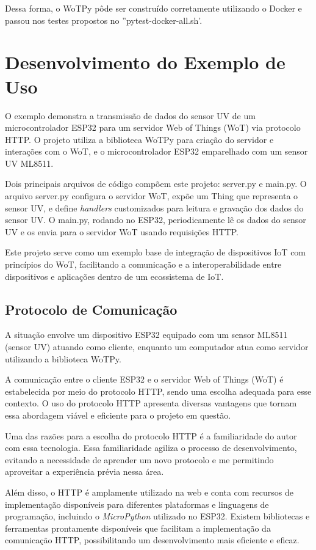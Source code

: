 Dessa forma, o WoTPy pôde ser construído corretamente utilizando o Docker e passou nos testes propostos no ''pytest-docker-all.sh'.

\section{Desenvolvimento do Exemplo de Uso}

O exemplo demonstra a transmissão de dados do sensor UV de um microcontrolador ESP32 para um servidor Web of Things (WoT) via protocolo HTTP. O projeto utiliza a biblioteca WoTPy para criação do servidor e interações com o WoT, e o microcontrolador ESP32 emparelhado com um sensor UV ML8511.

Dois principais arquivos de código compõem este projeto: server.py e main.py. O arquivo server.py configura o servidor WoT, expõe um Thing que representa o sensor UV, e define \textit{handlers} customizados para leitura e gravação dos dados do sensor UV. O main.py, rodando no ESP32, periodicamente lê os dados do sensor UV e os envia para o servidor WoT usando requisições HTTP.

Este projeto serve como um exemplo base de integração de dispositivos IoT com princípios do WoT, facilitando a comunicação e a interoperabilidade entre dispositivos e aplicações dentro de um ecossistema de IoT.

\subsection{Protocolo de Comunicação}

A situação envolve um dispositivo ESP32 equipado com um sensor ML8511 (sensor UV) atuando como cliente, enquanto um computador atua como servidor utilizando a biblioteca WoTPy.

A comunicação entre o cliente ESP32 e o servidor Web of Things (WoT) é estabelecida por meio do protocolo HTTP, sendo uma escolha adequada para esse contexto. O uso do protocolo HTTP apresenta diversas vantagens que tornam essa abordagem viável e eficiente para o projeto em questão.

Uma das razões para a escolha do protocolo HTTP é a familiaridade do autor com essa tecnologia. Essa familiaridade agiliza o processo de desenvolvimento, evitando a necessidade de aprender um novo protocolo e me permitindo aproveitar a experiência prévia nessa área.

Além disso, o HTTP é amplamente utilizado na web e conta com recursos de implementação disponíveis para diferentes plataformas e linguagens de programação, incluindo o \textit{MicroPython} utilizado no ESP32. Existem bibliotecas e ferramentas prontamente disponíveis que facilitam a implementação da comunicação HTTP, possibilitando um desenvolvimento mais eficiente e eficaz.

